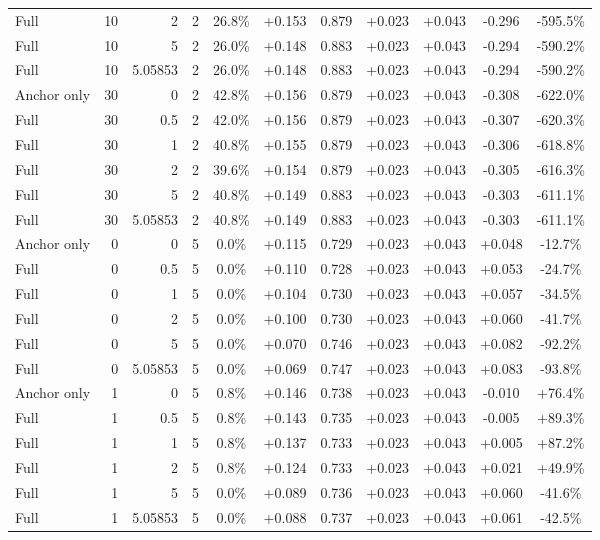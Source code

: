 \begin{table}[htbp]
\begin{tabular}{lrrrccccccc}
Full & 10 & 2 & 2 & 26.8\% & +0.153 & 0.879 & +0.023 & +0.043 & -0.296 & -595.5\% \\
Full & 10 & 5 & 2 & 26.0\% & +0.148 & 0.883 & +0.023 & +0.043 & -0.294 & -590.2\% \\
Full & 10 & 5.05853 & 2 & 26.0\% & +0.148 & 0.883 & +0.023 & +0.043 & -0.294 & -590.2\% \\
Anchor only & 30 & 0 & 2 & 42.8\% & +0.156 & 0.879 & +0.023 & +0.043 & -0.308 & -622.0\% \\
Full & 30 & 0.5 & 2 & 42.0\% & +0.156 & 0.879 & +0.023 & +0.043 & -0.307 & -620.3\% \\
Full & 30 & 1 & 2 & 40.8\% & +0.155 & 0.879 & +0.023 & +0.043 & -0.306 & -618.8\% \\
Full & 30 & 2 & 2 & 39.6\% & +0.154 & 0.879 & +0.023 & +0.043 & -0.305 & -616.3\% \\
Full & 30 & 5 & 2 & 40.8\% & +0.149 & 0.883 & +0.023 & +0.043 & -0.303 & -611.1\% \\
Full & 30 & 5.05853 & 2 & 40.8\% & +0.149 & 0.883 & +0.023 & +0.043 & -0.303 & -611.1\% \\
Anchor only & 0 & 0 & 5 & 0.0\% & +0.115 & 0.729 & +0.023 & +0.043 & +0.048 & -12.7\% \\
Full & 0 & 0.5 & 5 & 0.0\% & +0.110 & 0.728 & +0.023 & +0.043 & +0.053 & -24.7\% \\
Full & 0 & 1 & 5 & 0.0\% & +0.104 & 0.730 & +0.023 & +0.043 & +0.057 & -34.5\% \\
Full & 0 & 2 & 5 & 0.0\% & +0.100 & 0.730 & +0.023 & +0.043 & +0.060 & -41.7\% \\
Full & 0 & 5 & 5 & 0.0\% & +0.070 & 0.746 & +0.023 & +0.043 & +0.082 & -92.2\% \\
Full & 0 & 5.05853 & 5 & 0.0\% & +0.069 & 0.747 & +0.023 & +0.043 & +0.083 & -93.8\% \\
Anchor only & 1 & 0 & 5 & 0.8\% & +0.146 & 0.738 & +0.023 & +0.043 & -0.010 & +76.4\% \\
Full & 1 & 0.5 & 5 & 0.8\% & +0.143 & 0.735 & +0.023 & +0.043 & -0.005 & +89.3\% \\
Full & 1 & 1 & 5 & 0.8\% & +0.137 & 0.733 & +0.023 & +0.043 & +0.005 & +87.2\% \\
Full & 1 & 2 & 5 & 0.8\% & +0.124 & 0.733 & +0.023 & +0.043 & +0.021 & +49.9\% \\
Full & 1 & 5 & 5 & 0.0\% & +0.089 & 0.736 & +0.023 & +0.043 & +0.060 & -41.6\% \\
Full & 1 & 5.05853 & 5 & 0.0\% & +0.088 & 0.737 & +0.023 & +0.043 & +0.061 & -42.5\% \\

\end{tabular}
\end{table}
